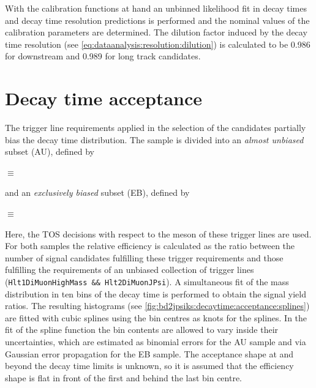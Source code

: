 With the calibration functions at hand an unbinned likelihood fit in decay
times and decay time resolution predictions is performed and the nominal
values of the calibration parameters are determined. The dilution factor
induced by the decay time resolution (see
\cref{eq:dataanalysis:resolution:dilution}) is calculated to be \num{0.986}
for downstream and \num{0.989} for long track candidates.

\section{Decay time acceptance}
\label{sec:bd2jpsiks:decaytime:acceptance}

The trigger line requirements applied in the selection of the \BdToJPsiKS
candidates partially bias the decay time distribution. The sample is divided
into an \emph{almost unbiased} subset (AU), defined by
\begin{description}\small
  \item[AU] $\equiv$ 
\end{description}
and an \emph{exclusively biased} subset (EB), defined by
\begin{description}\small
  \item[EB] $\equiv$ 
\end{description}
Here, the TOS decisions with respect to the \JPsi meson of these trigger lines
are used. For both samples the relative efficiency is calculated as the ratio
between the number of signal candidates fulfilling these trigger requirements
and those fulfilling the requirements of an unbiased collection of trigger
lines (\texttt{Hlt1DiMuonHighMass \&\& Hlt2DiMuonJPsi}). A simultaneous fit of
the mass distribution in ten bins of the decay time is performed to obtain the
signal yield ratios. The resulting histograms (see
\cref{fig:bd2jpsiks:decaytime:acceptance:splines}) are fitted with cubic
splines using the bin centres as knots for the splines. In the fit of the
spline function the bin contents are allowed to vary inside their
uncertainties, which are estimated as binomial errors for the AU sample and
via Gaussian error propagation for the EB sample. The acceptance shape at and
beyond the decay time limits is unknown, so it is assumed that the efficiency
shape is flat in front of the first and behind the last bin centre.

